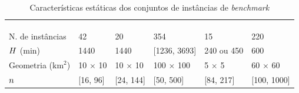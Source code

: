 \begin{table}[]
\newcommand{\firstColumnWidth}{1.52cm}
\newcommand{\columnWidth}{2.25cm}
\newcommand{\numberOfRows}{2}
\footnotesize
\caption{Características estáticas dos conjuntos de instâncias de 
         \textit{benchmark}}
\label{tab:instancias}
\begin{tabular}{llllll}
\toprule
\multirow{4}{\columnWidth}{} & 
  \multirow{\numberOfRows}{\columnWidth}{\textcite{ropke_models_2007}} & 
  \multirow{\numberOfRows}{\columnWidth}{\textcite{cordeau_tabu_2003}} & 
  \multirow{\numberOfRows}{\columnWidth}{\textcite{li_metaheuristic_2003}} & 
  \multirow{\numberOfRows}{\columnWidth}{
    \textcite{gendreau_neighborhood_2006}} & 
  \multirow{\numberOfRows}{\columnWidth}{
    \textcite{mitrovic-minic_waiting_2004}}
\\ & & & & & \\ & & & & & \\ & & & & & \\   
\midrule
\multirow{\numberOfRows}{\firstColumnWidth}{N. de instâncias} & 
  \multirow{\numberOfRows}{\columnWidth}{42} & 
  \multirow{\numberOfRows}{\columnWidth}{20} & 
  \multirow{\numberOfRows}{\columnWidth}{354} & 
  \multirow{\numberOfRows}{\columnWidth}{15} & 
  \multirow{\numberOfRows}{\columnWidth}{220}
\\ & & & & & \\
\multirow{\numberOfRows}{\firstColumnWidth}{$H$ (min)} & 
  \multirow{\numberOfRows}{\columnWidth}{1440} & 
  \multirow{\numberOfRows}{\columnWidth}{1440} & 
  \multirow{\numberOfRows}{\columnWidth}{[1236, 3693]} & 
  \multirow{\numberOfRows}{\columnWidth}{240 ou 450} & 
  \multirow{\numberOfRows}{\columnWidth}{600}
\\ & & & & & \\
  \multirow{\numberOfRows}{\firstColumnWidth}{Geometria ($\text{km}^2$)} & 
  \multirow{\numberOfRows}{\columnWidth}{10 $\times$ 10} & 
  \multirow{\numberOfRows}{\columnWidth}{10 $\times$ 10} & 
  \multirow{\numberOfRows}{\columnWidth}{100 $\times$ 100} & 
  \multirow{\numberOfRows}{\columnWidth}{5 $\times$ 5} & 
  \multirow{\numberOfRows}{\columnWidth}{60 $\times$ 60}
\\ & & & & & \\
\multirow{\numberOfRows}{\firstColumnWidth}{$n$} & 
  \multirow{\numberOfRows}{\columnWidth}{[16, 96]} & 
  \multirow{\numberOfRows}{\columnWidth}{[24, 144]} & 
  \multirow{\numberOfRows}{\columnWidth}{[50, 500]} & 
  \multirow{\numberOfRows}{\columnWidth}{[84, 217]} & 
  \multirow{\numberOfRows}{\columnWidth}{[100, 1000]}

\end{tabular}
\end{table}

